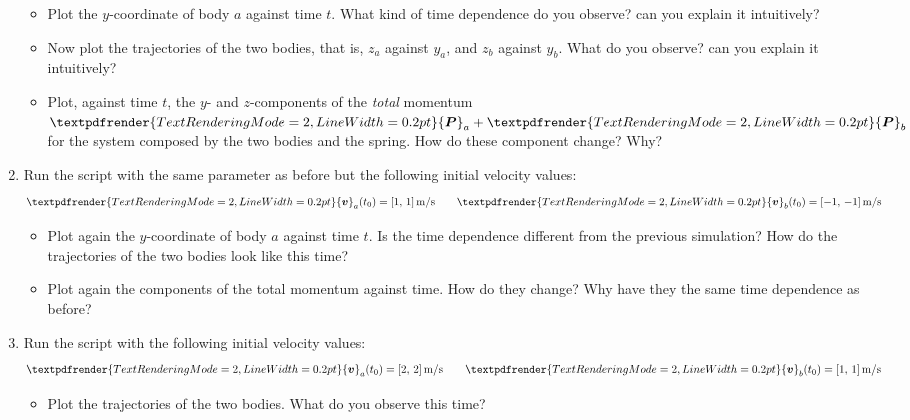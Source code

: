 \documentclass[a4paper,12pt,%
onecolumn,oneside,%
british%
]{memoir}
\renewcommand*{\bm}[1]{\textpdfrender{TextRenderingMode=2,LineWidth=0.2pt}{\boldsymbol{#1}}}
\renewcommand*{\|}[1][]{\nonscript\:#1\vert\nonscript\:\mathopen{}}
\newcommand*{\yv}{\bm{v}}
\newcommand*{\yva}{\yv_{a}}
\newcommand*{\yvb}{\yv_{b}}
\newcommand*{\yti}{t_{0}}
\newcommand*{\yP}{\bm{P}}
\newcommand*{\yPa}{\yP_{a}}
\newcommand*{\yPb}{\yP_{b}}
\begin{document}
\begin{exercise}[label={ex:hooke}]
\begin{enumerate}[exerc]
    \begin{itemize}
    \item Plot the $y$-coordinate of body $a$ against time $t$. What kind of time dependence do you observe? can you explain it intuitively?

    \item Now plot the trajectories of the two bodies, that is, $z_{a}$ against $y_{a}$, and $z_{b}$ against $y_{b}$. What do you observe? can you explain it intuitively?

    \item Plot, against time $t$, the $y$- and $z$-components of the \emph{total} momentum $\yPa+\yPb$ for the system composed by the two bodies and the spring. How do these component change? Why?
    \end{itemize}

  \item Run the script with the same parameter as before but the following initial velocity values:
    \begin{equation*}
      \begin{gathered}
        \yva(\yti)=[\num{1},\, \num{1}]\,\unit{m/s}
        \qquad
        \yvb(\yti)=[\num{-1},\, \num{-1}]\,\unit{m/s}
      \end{gathered}
    \end{equation*}

    \begin{itemize}
    \item Plot again the $y$-coordinate of body $a$ against time $t$. Is the time dependence different from the previous simulation? How do the trajectories of the two bodies look like this time?

    \item Plot again the components of the total momentum against time. How do they change? Why have they the same time dependence as before?
    \end{itemize}

      \item Run the script with the following initial velocity values:
    \begin{equation*}
      \begin{gathered}
        \yva(\yti)=[\num{2},\, \num{2}]\,\unit{m/s}
        \qquad
        \yvb(\yti)=[\num{1},\, \num{1}]\,\unit{m/s}
      \end{gathered}
    \end{equation*}

    \begin{itemize}
    \item Plot the trajectories of the two bodies. What do you observe this time?


\end{itemize}
\end{enumerate}
\end{exercise}
\end{document}
